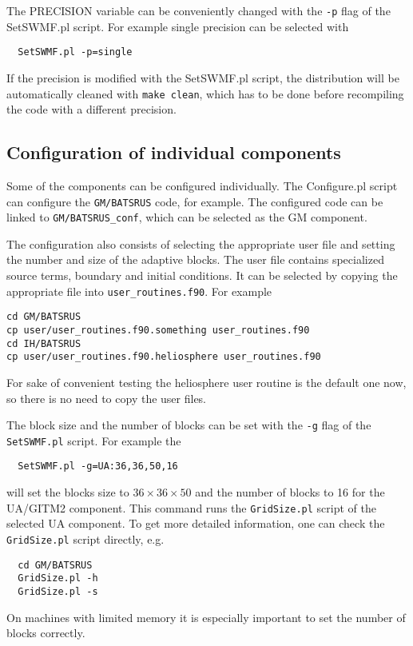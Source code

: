 The PRECISION variable can be conveniently changed with the
{\tt -p} flag of the SetSWMF.pl script. For example single
precision can be selected with
\begin{verbatim}
  SetSWMF.pl -p=single
\end{verbatim}
If the precision is modified with the SetSWMF.pl script,
the distribution will be automatically cleaned with 
{\tt make clean}, which has to be done before recompiling the
code with a different precision. 

\subsection{Configuration of individual components}

Some of the components can be configured individually. 
The Configure.pl script can configure the {\tt GM/BATSRUS} code, for example.
The configured code can be linked to {\tt GM/BATSRUS\_conf}, which can
be selected as the GM component.

The configuration also consists of selecting the 
appropriate user file and setting the number and size of the
adaptive blocks. The user file contains specialized
source terms, boundary and initial conditions. It can be 
selected by copying the appropriate file into {\tt user\_routines.f90}.
For example
\begin{verbatim}
cd GM/BATSRUS
cp user/user_routines.f90.something user_routines.f90
cd IH/BATSRUS
cp user/user_routines.f90.heliosphere user_routines.f90
\end{verbatim}
For sake of convenient testing the heliosphere user routine is
the default one now, so there is no need to copy the user files.

The block size and the number of blocks can be set with the 
{\tt -g} flag of the {\tt SetSWMF.pl} script.
For example the
\begin{verbatim}
  SetSWMF.pl -g=UA:36,36,50,16
\end{verbatim}
will set the blocks size to $36\times 36\times 50$ and the number of blocks to 
16 for the UA/GITM2 component. This command runs the {\tt GridSize.pl}
script of the selected UA component. To get more detailed information, one can
check the {\tt GridSize.pl} script directly, e.g.
\begin{verbatim}
  cd GM/BATSRUS
  GridSize.pl -h
  GridSize.pl -s
\end{verbatim}
On machines with limited memory it is especially important to
set the number of blocks correctly. 

